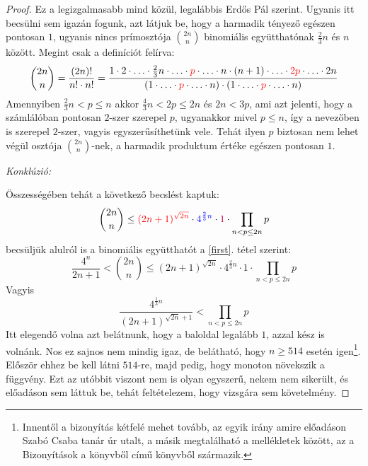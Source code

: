 \documentclass[12pt]{book}
\theoremstyle{plain} %
\theoremstyle{definition} %
\theoremstyle{remark}
\numberwithin{equation}{section}  %
\begin{document}
\begin{proof}
		Ez a legizgalmasabb mind közül, legalábbis Erdős Pál szerint. Ugyanis itt becsülni sem igazán fogunk, azt látjuk be, hogy a harmadik tényező egészen pontosan $1$, ugyanis nincs prímosztója ${2n\choose n}$ binomiális együtthatónak $\frac{2}{3}n$ és $n$ között. Megint csak a definíciót felírva:
		\[ {2n\choose n} = \dfrac{(2n)!}{n!\cdot n!} = \dfrac{1\cdot 2\cdot \ldots \cdot \frac{2}{3}n \cdot \ldots \cdot \color{red}p\color{black} \cdot \ldots \cdot n \cdot (n+1) \cdot \ldots \cdot \color{red}2p\color{black} \cdot \ldots \cdot 2n}{(1\cdot \ldots \cdot \color{red}p\color{black} \cdot \ldots \cdot n) \cdot (1\cdot \ldots \cdot \color{red}p\color{black} \cdot \ldots \cdot n)}  \]
		Amennyiben $\frac{2}{3}n < p \leq n$ akkor $ \frac{4}{3} n < 2p\leq 2n$ és $2n<3p$, ami azt jelenti, hogy a számlálóban pontosan $2$-szer szerepel $p$, ugyanakkor mivel $p\leq n$, így a nevezőben is szerepel $2$-szer, vagyis egyszerűsíthetünk vele. Tehát ilyen $p$ biztosan nem lehet végül osztója ${2n\choose n}$-nek, a harmadik produktum értéke egészen pontosan $1$.
		
		\textit{Konklúzió:}
		
		Összességében tehát a következő becslést kaptuk:
		\[ {2n\choose n} \leq \color{red} (2n+1)^{\sqrt{2n}} \color{black} \cdot \color{blue} 4^{\frac{2}{3}n} \color{black} \cdot \color{purple} 1 \color{black} \cdot \prod_{n<p\leq 2n} p   \]
		becsüljük alulról is a binomiális együtthatót a \ref{first}. tétel szerint:
		\[ \dfrac{4^n}{2n+1}  < {2n\choose n} \leq (2n+1)^{\sqrt{2n}} \cdot 4^{\frac{2}{3}n} \cdot 1 \cdot \prod_{n<p\leq 2n} p   \]
		Vagyis
		\[ \dfrac{4^{\frac{1}{3}n}}{(2n+1)^{\sqrt{2n}+1}} < \prod_{n<p\leq 2n} p  \]
		Itt elegendő volna azt belátnunk, hogy a baloldal legalább $1$, azzal kész is volnánk. Nos ez sajnos nem mindig igaz, de belátható, hogy $n\geq 514$ esetén igen\footnote{Innentől a bizonyítás kétfelé mehet tovább, az egyik irány amire előadáson Szabó Csaba tanár úr utalt, a másik megtalálható a mellékletek között, az a Bizonyítások a könyvből című könyvből származik.}. Először ehhez be kell látni $514$-re, majd pedig, hogy monoton növekszik a függvény. Ezt az utóbbit viszont nem is olyan egyszerű, nekem nem sikerült, és előadáson sem láttuk be, tehát feltételezem, hogy vizsgára sem követelmény.
		

\end{proof}
\end{document}
